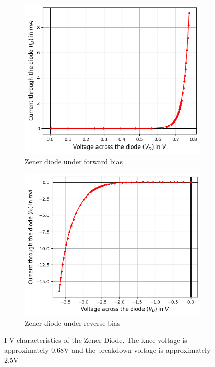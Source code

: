     \begin{figure}[H]
     \centering
     \begin{subfigure}[b]{0.45\textwidth}
         \centering
         \includegraphics[width=\textwidth]{images/3.png}
         \caption{Zener diode under forward bias}
         \label{fig1}
     \end{subfigure}
     \hfill
     \begin{subfigure}[b]{0.45\textwidth}
         \centering
         \includegraphics[width=\textwidth]{images/4.png}
         \caption{Zener diode under reverse bias}
         \label{fig2}
     \end{subfigure}
     \hfill
        \caption{I-V characteristics of the Zener Diode. The knee voltage is approximately 0.68V and the breakdown voltage is approximately 2.5V}
        \label{f1}
\end{figure}

